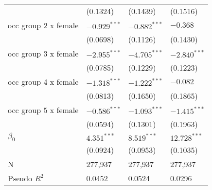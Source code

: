 \begin{tabular}{llll}
                                       &           (0.1324) &           (0.1439) &           (0.1516) \\
occ group 2 x female                   &     $-0.929^{***}$ &     $-0.882^{***}$ &           $-0.368$ \\
                                       &           (0.0698) &           (0.1126) &           (0.1430) \\
occ group 3 x female                   &     $-2.955^{***}$ &     $-4.705^{***}$ &     $-2.840^{***}$ \\
                                       &           (0.0785) &           (0.1229) &           (0.1223) \\
occ group 4 x female                   &     $-1.318^{***}$ &     $-1.222^{***}$ &           $-0.082$ \\
                                       &           (0.0813) &           (0.1650) &           (0.1865) \\
occ group 5 x female                   &     $-0.586^{***}$ &     $-1.093^{***}$ &     $-1.415^{***}$ \\
                                       &           (0.0594) &           (0.1301) &           (0.1963) \\
$\beta_0$                              &      $4.351^{***}$ &      $8.519^{***}$ &     $12.728^{***}$ \\
                                       &           (0.0924) &           (0.0953) &           (0.1035) \\
N                                      &            277,937 &            277,937 &            277,937 \\
Pseudo $R^2$                           &             0.0452 &             0.0524 &             0.0296 \\
\bottomrule
\end{tabular}
